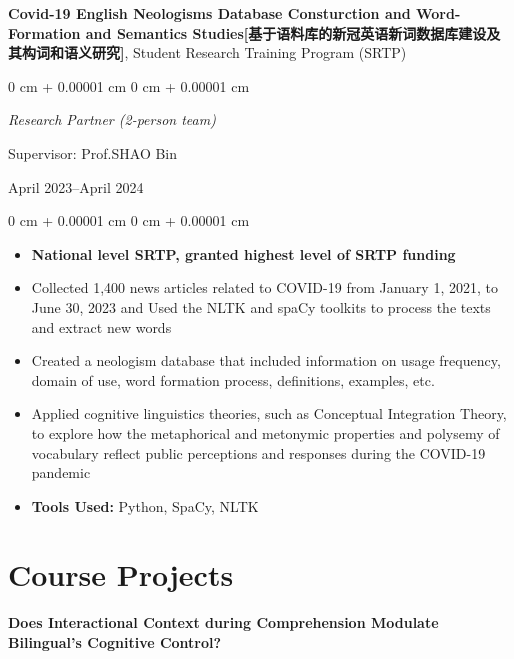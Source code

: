 \documentclass[10pt, letterpaper]{article}
\newenvironment{highlights}{
    \begin{itemize}[
        topsep=0.10 cm,
        parsep=0.10 cm,
        partopsep=0pt,
        itemsep=0pt,
        leftmargin=0 cm + 10pt
    ]
}{
    \end{itemize}
} %
\newenvironment{onecolentry}{
    \begin{adjustwidth}{
        0 cm + 0.00001 cm
    }{
        0 cm + 0.00001 cm
    }
}{
    \end{adjustwidth}
} %
\newenvironment{twocolentry}[2][]{
    \onecolentry
    \def\secondColumn{#2}
    \setcolumnwidth{\fill, 4.5 cm}
    \begin{paracol}{2}
}{
    \switchcolumn \raggedleft \secondColumn
    \end{paracol}
    \endonecolentry
} %
\begin{document}
    \vspace{0.3 cm}

    \textbf{Covid-19 English Neologisms Database Consturction and Word-Formation and Semantics Studies[基于语料库的新冠英语新词数据库建设及其构词和语义研究]}, Student Research Training Program (SRTP)

    \vspace{0.10 cm}

    \begin{twocolentry}{
        April 2023–April 2024
    }
       \textit{Research Partner (2-person team)}
        \item Supervisor: Prof.SHAO Bin
    
    \end{twocolentry}

    \vspace{0.10 cm}
    \begin{onecolentry}
        \begin{highlights}
            \item \textbf{National level SRTP, granted highest level of SRTP funding}
            \item Collected 1,400 news articles related to COVID-19 from January 1, 2021, to June 30, 2023 and Used the NLTK and spaCy toolkits to process the texts and extract new words
            \item Created a neologism database that included information on usage frequency, domain of use, word formation process, definitions, examples, etc.
            \item Applied cognitive linguistics theories, such as Conceptual Integration Theory, to explore how the metaphorical and metonymic properties and polysemy of vocabulary reflect public perceptions and responses during the COVID-19 pandemic
            \item \textbf{Tools Used:} Python, SpaCy, NLTK
        \end{highlights}
    \end{onecolentry}
    
\section{Course Projects}

        \textbf{Does Interactional Context during Comprehension Modulate Bilingual’s Cognitive Control?}

        \vspace{0.10cm}
\end{document}
